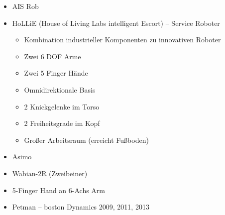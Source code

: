 \begin{itemize}
	\item AIS Rob
	\item HoLLiE (House of Living Labs intelligent Escort) -- Service Roboter
	\begin{itemize}
		\item Kombination industrieller Komponenten zu innovativen Roboter
		\item Zwei 6 DOF Arme
		\item Zwei 5 Finger Hände
		\item Omnidirektionale Basis
		\item 2 Knickgelenke im Torso
		\item 2 Freiheitsgrade im Kopf
		\item Großer Arbeitsraum (erreicht Fußboden)
	\end{itemize}
	\item Asimo
	\item Wabian-2R (Zweibeiner)
	\item 5-Finger Hand an 6-Achs Arm
	\item Petman -- boston Dynamics 2009, 2011, 2013
\end{itemize}